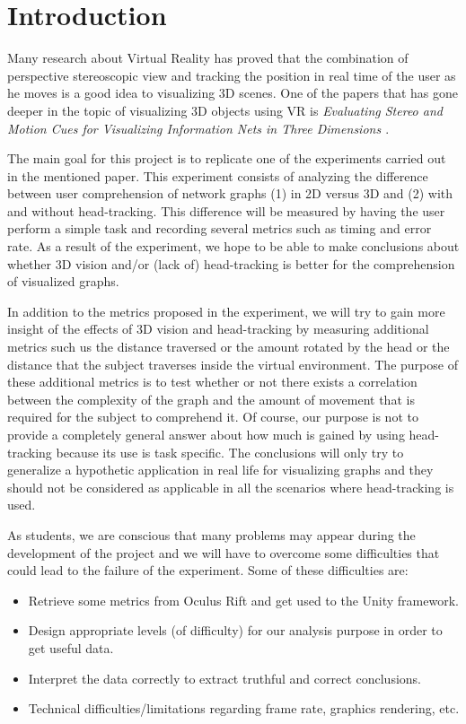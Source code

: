 \chapter{Introduction}

Many research about Virtual Reality has proved that the combination of
perspective stereoscopic view and tracking the position in real time of
the user as he moves is a good idea to visualizing 3D scenes. One of the
papers that has gone deeper in the topic of visualizing 3D objects using
VR is \emph{Evaluating Stereo and Motion Cues for Visualizing
Information Nets in Three Dimensions \cite{ware1996evaluating}}.

The main goal for this project is to replicate one of the experiments
carried out in the mentioned paper. This experiment consists of
analyzing the difference between user comprehension of network graphs
(1) in 2D versus 3D and (2) with and without head-tracking. This
difference will be measured by having the user perform a simple task and
recording several metrics such as timing and error rate. As a result of
the experiment, we hope to be able to make conclusions about whether 3D
vision and/or (lack of) head-tracking is better for the comprehension of
visualized graphs.

In addition to the metrics proposed in the experiment, we will try to
gain more insight of the effects of 3D vision and head-tracking by
measuring additional metrics such us the distance traversed or the
amount rotated by the head or the distance that the subject traverses
inside the virtual environment. The purpose of these additional metrics
is to test whether or not there exists a correlation between the
complexity of the graph and the amount of movement that is required for
the subject to comprehend it. Of course, our purpose is not to provide a
completely general answer about how much is gained by using
head-tracking because its use is task specific. The conclusions will
only try to generalize a hypothetic application in real life for
visualizing graphs and they should not be considered as applicable in
all the scenarios where head-tracking is used.

As students, we are conscious that many problems may appear during the
development of the project and we will have to overcome some
difficulties that could lead to the failure of the experiment. Some of
these difficulties are:

\begin{itemize}
\item
  Retrieve some metrics from Oculus Rift and get used to the Unity
  framework.
\item
  Design appropriate levels (of difficulty) for our analysis purpose in
  order to get useful data.
\item
  Interpret the data correctly to extract truthful and correct
  conclusions.
\item
  Technical difficulties/limitations regarding frame rate, graphics
  rendering, etc.
\end{itemize}

